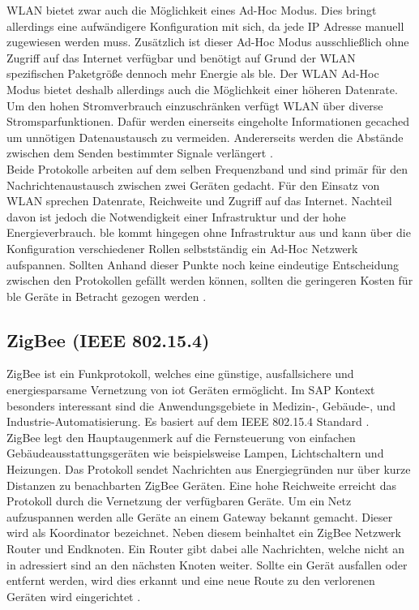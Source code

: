 \noindent WLAN bietet zwar auch die Möglichkeit eines Ad-Hoc Modus. Dies bringt allerdings eine aufwändigere Konfiguration mit sich, da jede IP Adresse manuell zugewiesen werden muss. Zusätzlich ist dieser Ad-Hoc Modus ausschließlich ohne Zugriff auf das Internet verfügbar und benötigt auf Grund der WLAN spezifischen Paketgröße dennoch mehr Energie als \ac{ble}. Der WLAN Ad-Hoc Modus bietet deshalb allerdings auch die Möglichkeit einer höheren Datenrate. Um den hohen Stromverbrauch einzuschränken verfügt WLAN über diverse Stromsparfunktionen. Dafür werden einerseits eingeholte Informationen gecached um unnötigen Datenaustausch zu vermeiden. Andererseits werden die Abstände zwischen dem Senden bestimmter Signale verlängert \cite[Seite 240ff]{Gessler15:WNN}.\\ 

\noindent Beide Protokolle arbeiten auf dem selben Frequenzband und sind primär für den Nachrichtenaustausch zwischen zwei Geräten gedacht. Für den Einsatz von WLAN sprechen Datenrate, Reichweite und Zugriff auf das Internet. Nachteil davon ist jedoch die Notwendigkeit einer Infrastruktur und der hohe Energieverbrauch. \ac{ble} kommt hingegen ohne Infrastruktur aus und kann über die Konfiguration verschiedener Rollen selbstständig ein Ad-Hoc Netzwerk aufspannen. Sollten Anhand dieser Punkte noch keine eindeutige Entscheidung zwischen den Protokollen gefällt werden können, sollten die geringeren Kosten für \ac{ble} Geräte in Betracht gezogen werden \cite[Seite 271]{Gessler15:WNN}.\\   

\subsection{ZigBee (IEEE 802.15.4)}
\label{ss:vergleich:zigbee}

\noindent ZigBee ist ein Funkprotokoll, welches eine günstige, ausfallsichere und energiesparsame Vernetzung von \ac{iot} Geräten ermöglicht. Im SAP Kontext besonders interessant sind die Anwendungsgebiete in Medizin-, Gebäude-, und Industrie-Automatisierung. Es basiert auf dem IEEE 802.15.4 Standard \cite[Seite 195]{Gessler15:WNN}.\\  

\noindent ZigBee legt den Hauptaugenmerk auf die Fernsteuerung von einfachen Gebäudeausstattungsgeräten wie beispielsweise Lampen, Lichtschaltern und Heizungen. Das Protokoll sendet Nachrichten aus Energiegründen nur über kurze Distanzen zu benachbarten ZigBee Geräten. Eine hohe Reichweite erreicht das Protokoll durch die Vernetzung der verfügbaren Geräte. Um ein Netz aufzuspannen werden alle Geräte an einem Gateway bekannt gemacht. Dieser wird als Koordinator bezeichnet. Neben diesem beinhaltet ein ZigBee Netzwerk Router und Endknoten. Ein Router gibt dabei alle Nachrichten, welche nicht an in adressiert sind an den nächsten Knoten weiter. Sollte ein Gerät ausfallen oder entfernt werden, wird dies erkannt und eine neue Route zu den verlorenen Geräten wird eingerichtet \cite{ZIG20:WWW}.\\

